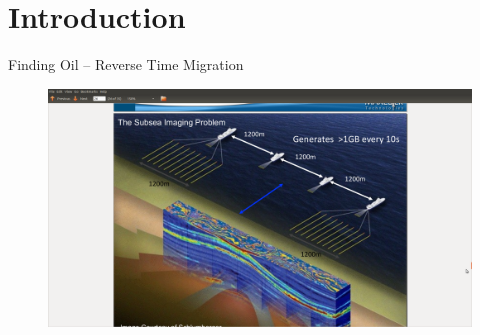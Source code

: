 \section{Introduction}

\begin{frame}{Finding Oil -- Reverse Time Migration}
 \begin{figure}[!ht]
   \includegraphics[scale=0.22, clip=true, trim=300 50 300 120]{figs/rtm-picture.png}
  \end{figure}
\end{frame}

